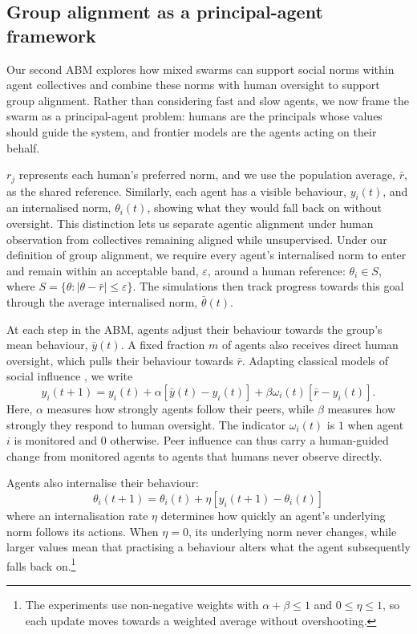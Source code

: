 

\subsection{Group alignment as a principal-agent framework}

Our second ABM explores how mixed swarms can support social norms within agent collectives and combine these norms with human oversight to support group alignment. Rather than considering fast and slow agents, we now frame the swarm as a principal-agent problem: humans are the principals whose values should guide the system, and frontier models are the agents acting on their behalf. 

$r_j$ represents each human's preferred norm, and we use the population average, $\bar r$, as the shared reference. Similarly, each agent has a visible behaviour, $y_i(t)$, and an internalised norm, $\theta_i(t)$, showing what they would fall back on without oversight. This distinction lets us separate agentic alignment under human observation from collectives remaining aligned while unsupervised. Under our definition of group alignment, we require every agent's internalised norm to enter and remain within an acceptable band, $\varepsilon$, around a human reference: $\theta_i\in S$, where $S=\{\theta:|\theta-\bar r|\leq\varepsilon\}$. The simulations then track progress towards this goal through the average internalised norm, $\bar\theta(t)$.

At each step in the ABM, agents adjust their behaviour towards the group's mean behaviour, $\bar y(t)$. A fixed fraction $m$ of agents also receives direct human oversight, which pulls their behaviour towards $\bar r$. Adapting classical models of social influence \parencite{degroot1974,friedkin1990}, we write
\begin{equation}
    y_i(t+1)=y_i(t)+\alpha[\bar y(t)-y_i(t)]
    +\beta\omega_i(t)[\bar r-y_i(t)].
    \label{eq:social-norm-behaviour}
\end{equation}
Here, $\alpha$ measures how strongly agents follow their peers, while $\beta$ measures how strongly they respond to human oversight. The indicator $\omega_i(t)$ is $1$ when agent $i$ is monitored and $0$ otherwise. Peer influence can thus carry a human-guided change from monitored agents to agents that humans never observe directly.

Agents also internalise their behaviour:
\begin{equation}
    \theta_i(t+1)=\theta_i(t)+\eta[y_i(t+1)-\theta_i(t)]
    \label{eq:norm-internalisation}
\end{equation}
where an internalisation rate $\eta$ determines how quickly an agent's underlying norm follows its actions. When $\eta=0$, its underlying norm never changes, while larger values mean that practising a behaviour alters what the agent subsequently falls back on.\footnote{The experiments use non-negative weights with $\alpha+\beta\leq1$ and $0\leq\eta\leq1$, so each update moves towards a weighted average without overshooting.}


